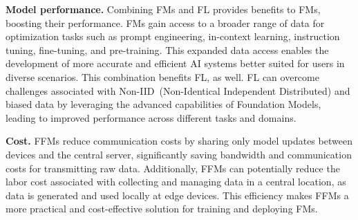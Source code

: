 \textbf{Model performance.}
Combining FMs and FL provides benefits to FMs, boosting their performance. FMs gain access to a broader range of data for optimization tasks such as prompt engineering, in-context learning, instruction tuning, fine-tuning, and pre-training. This expanded data access enables the development of more accurate and efficient AI systems better suited for users in diverse scenarios. This combination benefits FL, as well. FL can overcome challenges associated with Non-IID~(Non-Identical Independent Distributed) and biased data by leveraging the advanced capabilities of Foundation Models, leading to improved performance across different tasks and domains.



\textbf{Cost.}
FFMs reduce communication costs by sharing only model updates between devices and the central server, significantly saving bandwidth and communication costs for transmitting raw data. Additionally, FFMs can potentially reduce the labor cost associated with collecting and managing data in a central location, as data is generated and used locally at edge devices. This efficiency makes FFMs a more practical and cost-effective solution for training and deploying FMs.




